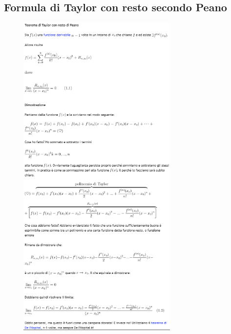 \documentclass[a4paper, 9pt]{report}
\begin{document}
\subsection*{Formula di Taylor con resto secondo Peano}
\begin{figure}[h!]
    \includegraphics[width=300px]{../dim/taylorpeano1.PNG}
\end{figure}
\newpage
\end{document}
